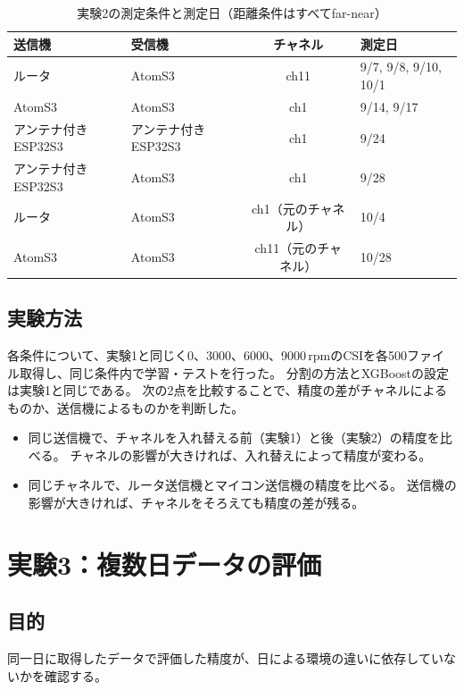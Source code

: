 \documentclass[uplatex, 12pt]{ujbook}
\begin{document}
\begin{table}[htbp]
  \centering
  \caption{実験2の測定条件と測定日（距離条件はすべてfar-near）}
  \label{tab:exp2}
  \begin{tabular}{l l c l}
    \toprule
    送信機 & 受信機 & チャネル & 測定日 \\
    \midrule
    ルータ & AtomS3 & ch11 & 9/7, 9/8, 9/10, 10/1 \\
    AtomS3 & AtomS3 & ch1 & 9/14, 9/17 \\
    アンテナ付きESP32S3 & アンテナ付きESP32S3 & ch1 & 9/24 \\
    アンテナ付きESP32S3 & AtomS3 & ch1 & 9/28 \\
    \midrule
    ルータ & AtomS3 & ch1（元のチャネル） & 10/4 \\
    AtomS3 & AtomS3 & ch11（元のチャネル） & 10/28 \\
    \bottomrule
  \end{tabular}
\end{table}

\section{実験方法}
各条件について、実験1と同じく0、3000、6000、9000\,rpmのCSIを各500ファイル取得し、同じ条件内で学習・テストを行った。
分割の方法とXGBoostの設定は実験1と同じである。
次の2点を比較することで、精度の差がチャネルによるものか、送信機によるものかを判断した。
\begin{itemize}
  \item 同じ送信機で、チャネルを入れ替える前（実験1）と後（実験2）の精度を比べる。
        チャネルの影響が大きければ、入れ替えによって精度が変わる。
  \item 同じチャネルで、ルータ送信機とマイコン送信機の精度を比べる。
        送信機の影響が大きければ、チャネルをそろえても精度の差が残る。
\end{itemize}

\chapter{実験3：複数日データの評価}
\section{目的}
同一日に取得したデータで評価した精度が、日による環境の違いに依存していないかを確認する。
\end{document}
